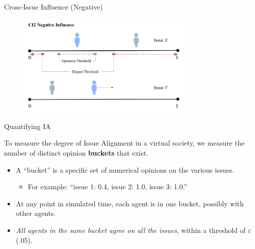 \documentclass[12pt]{beamer}
\begin{document}
\begin{frame}[c]{Cross-Issue Influence (Negative)}  %



\begin{figure}
	\includegraphics[width=0.75\textwidth]{images/CI2Negative.png}
\end{figure}

\end{frame}
\begin{frame}[c]{Quantifying IA} %

To measure the degree of Issue Alignment in a virtual society, we measure the
number of distinct opinion \textbf{buckets} that exist.

\bigskip
\pause
\begin{itemize}
\itemsep.1em

\item A ``bucket'' is a specific set of numerical opinions on the various issues.
\pause
\begin{itemize}
\itemsep.1em
\item For example: ``issue 1: 0.4, issue 2: 1.0, issue 3: 1.0.''
\end{itemize}

\pause

\item At any point in simulated time, each agent is in one bucket, possibly with
other agents.

\pause
\item \textit{All agents in the same bucket agree on all the issues}, within a
threshold of $\varepsilon$ (.05).

\end{itemize}

\end{frame}
\end{document}
